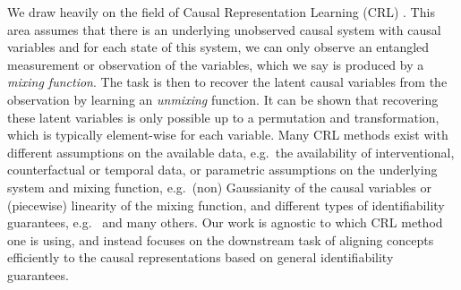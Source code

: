 We draw heavily on the field of Causal Representation Learning (CRL)
\citep{scholkopf2021crl}. This area assumes that there is an underlying
unobserved causal system with causal variables and for each state of this
system, we can only observe an entangled measurement or observation of the
variables, which we say is produced by a \emph{mixing function}. The task is
then to recover the latent causal variables from the observation by learning an
\emph{unmixing} function. It can be shown that recovering these latent
variables is only possible up to a permutation and transformation, which is
typically element-wise for each variable. Many CRL methods exist with different
assumptions on the available data, e.g.\ the availability of interventional,
counterfactual or temporal data, or parametric assumptions on the underlying
system and mixing function, e.g.\ (non) Gaussianity of the causal variables or
(piecewise) linearity of the mixing function, and different types of
identifiability guarantees, e.g.\
\citep{hyvarinen2019nonlinear,khemakhem2020vaeica,
KugelgenSGBSBL21,lachapelle2022dms, LippeMLACG22, ahujaMWB2023,
lachapelle2024nonparametric, YaoXLMTMKL24} and many others. Our work is
agnostic to which CRL method one is using, and instead focuses on the
downstream task of aligning concepts efficiently to the causal representations
based on general identifiability guarantees.